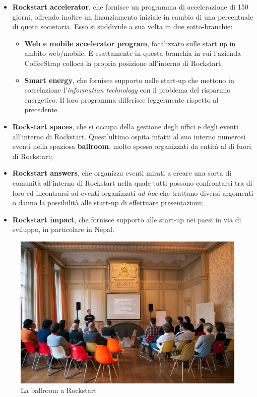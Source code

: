 \begin{itemize}

\item \textbf{Rockstart accelerator}, che fornisce un programma di accelerazione di 150 giorni, offrendo inoltre un finanziamento iniziale in cambio di una percentuale di quota societaria. Esso si suddivide a sua volta in due sotto-branchie:

\begin{itemize}

\item \textbf{Web e mobile accelerator program}, focalizzato sulle start up in ambito web/mobile. È esattamente in questa branchia in cui l'azienda CoffeeStrap colloca la propria posizione all'interno di Rockstart;

\item \textbf{Smart energy}, che fornisce supporto nelle start-up che mettono in correlazione l'\textit{information technology} con il problema del risparmio energetico. Il loro programma differisce leggermente rispetto al precedente.

\end{itemize}

\item \textbf{Rockstart spaces}, che si occupa della gestione degli uffici e degli eventi all'interno di Rockstart. Quest'ultimo ospita infatti al suo interno numerosi eventi nella spaziosa \textbf{ballroom}, molto spesso organizzati da entità al di fuori di Rockstart;

\item \textbf{Rockstart answers}, che organizza eventi mirati a creare una sorta di comunità all'interno di Rockstart nella quale tutti possono confrontarsi tra di loro ed incontrarsi ad eventi organizzati \textit{ad-hoc} che trattano diversi argomenti o danno la possibilità alle start-up di effettuare presentazioni;

\item \textbf{Rockstart impact}, che fornisce supporto alle start-up nei paesi in via di sviluppo, in particolare in Nepal. 

\end{itemize}

\begin{figure}[htpd]
\centering
\includegraphics[width=\textwidth]{../immagini/rockstart-ballroom}
\caption{La ballroom a Rockstart}  
\end{figure}

